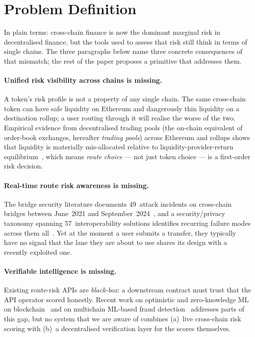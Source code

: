 \documentclass[11pt,a4paper]{article}
\begin{document}
\section{Problem Definition}\label{sec:problem}

In plain terms: cross-chain finance is now the dominant marginal risk in
decentralised finance, but the tools used to assess that risk still think in
terms of single chains. The three paragraphs below name three concrete consequences
of that mismatch; the rest of the paper proposes a primitive that addresses them.

\paragraph{Unified risk visibility across chains is missing.} A token's risk profile is
not a property of any single chain. The same cross-chain token can have safe
liquidity on Ethereum and dangerously thin liquidity on a destination rollup; a user
routing through it will realise the worse of the two. Empirical evidence from
decentralised trading pools (the on-chain equivalent of order-book exchanges, hereafter
\emph{trading pools}) across Ethereum and rollups shows that liquidity is materially
mis-allocated relative to liquidity-provider-return
equilibrium~\cite{gogol2024liquidity}, which means \emph{route choice} --- not just
token choice --- is a first-order risk decision.

\paragraph{Real-time route risk awareness is missing.} The bridge security literature
documents 49~attack incidents on cross-chain bridges between June~2021 and
September~2024~\cite{wu2025safeguarding}, and a security/privacy taxonomy spanning
57~interoperability solutions identifies recurring failure modes across them
all~\cite{augusto2024sok}. Yet at the moment a user submits a transfer, they typically
have no signal that the lane they are about to use shares its design with a recently
exploited one.

\paragraph{Verifiable intelligence is missing.} Existing route-risk APIs are
\emph{black-box}: a downstream contract must trust that the API operator scored honestly.
Recent work on optimistic and zero-knowledge ML on
blockchain~\cite{conway2024opml,ganescu2024trust} and on multichain ML-based fraud
detection~\cite{palaiokrassas2023multichain} addresses parts of this gap, but no system
that we are aware of combines (a)~live cross-chain risk scoring with (b)~a decentralised
verification layer for the scores themselves.
\end{document}
